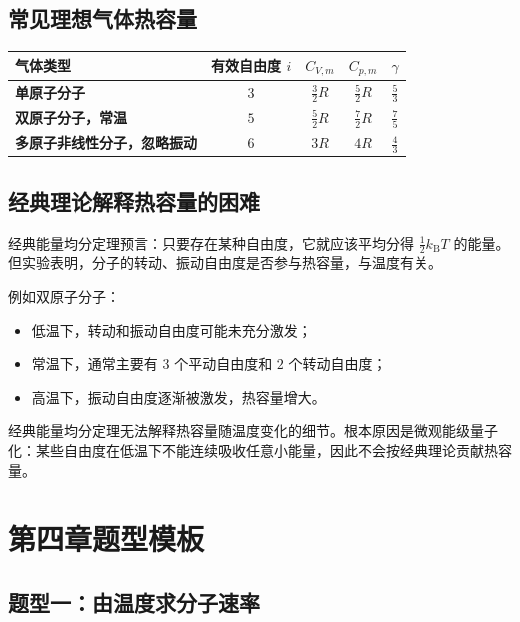 \subsection{常见理想气体热容量}

\begin{FormulaBox}[经典能量均分给出的热容量]
\begin{tabularx}{\textwidth}{@{}>{\bfseries}lcccX@{}}
\toprule
气体类型 & 有效自由度 \(i\) & \(C_{V,m}\) & \(C_{p,m}\) & \(\gamma\)\\
\midrule
单原子分子 & \(3\) & \(\frac32R\) & \(\frac52R\) & \(\frac53\)\\[0.4em]
双原子分子，常温 & \(5\) & \(\frac52R\) & \(\frac72R\) & \(\frac75\)\\[0.4em]
多原子非线性分子，忽略振动 & \(6\) & \(3R\) & \(4R\) & \(\frac43\)\\
\bottomrule
\end{tabularx}
\end{FormulaBox}

\subsection{经典理论解释热容量的困难}

经典能量均分定理预言：只要存在某种自由度，它就应该平均分得 \(\frac12k_{\mathrm B}T\) 的能量。但实验表明，分子的转动、振动自由度是否参与热容量，与温度有关。

例如双原子分子：
\begin{itemize}
  \item 低温下，转动和振动自由度可能未充分激发；
  \item 常温下，通常主要有 \(3\) 个平动自由度和 \(2\) 个转动自由度；
  \item 高温下，振动自由度逐渐被激发，热容量增大。
\end{itemize}

\begin{KeyBox}[经典理论的局限]
经典能量均分定理无法解释热容量随温度变化的细节。根本原因是微观能级量子化：某些自由度在低温下不能连续吸收任意小能量，因此不会按经典理论贡献热容量。
\end{KeyBox}

\section{第四章题型模板}

\subsection{题型一：由温度求分子速率}

